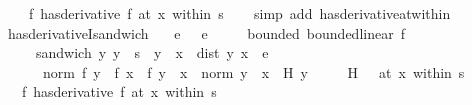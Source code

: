\begin{isabellebody}
\ \ \ \ {\isacharparenleft}{\kern0pt}f\ has{\isacharunderscore}{\kern0pt}derivative\ f{\isacharprime}{\kern0pt}{\isacharparenright}{\kern0pt}\ {\isacharparenleft}{\kern0pt}at\ x\ within\ s{\isacharparenright}{\kern0pt}{\isachardoublequoteclose}\isanewline
%
\isadelimproof
\ \ %
\endisadelimproof
%
\isatagproof
{}\isamarkupfalse%
\ {\isacharparenleft}{\kern0pt}simp\ add{\isacharcolon}{\kern0pt}\ has{\isacharunderscore}{\kern0pt}derivative{\isacharunderscore}{\kern0pt}at{\isacharunderscore}{\kern0pt}within{\isacharparenright}{\kern0pt}%
\endisatagproof
{\isafoldproof}%
%
\isadelimproof
\isanewline
%
\endisadelimproof
\isanewline
{}\isamarkupfalse%
\ has{\isacharunderscore}{\kern0pt}derivativeI{\isacharunderscore}{\kern0pt}sandwich{\isacharcolon}{\kern0pt}\isanewline
\ \ \ e{\isacharcolon}{\kern0pt}\ {\isachardoublequoteopen}{}\ {\isacharless}{\kern0pt}\ e{\isachardoublequoteclose}\isanewline
\ \ \ \ \ bounded{\isacharcolon}{\kern0pt}\ {\isachardoublequoteopen}bounded{\isacharunderscore}{\kern0pt}linear\ f{\isacharprime}{\kern0pt}{\isachardoublequoteclose}\isanewline
\ \ \ \ \ sandwich{\isacharcolon}{\kern0pt}\ {\isachardoublequoteopen}{\isacharparenleft}{\kern0pt}{\isasymAnd}y{\isachardot}{\kern0pt}\ y\ {\isasymin}\ s\ {\isasymLongrightarrow}\ y\ {\isasymnoteq}\ x\ {\isasymLongrightarrow}\ dist\ y\ x\ {\isacharless}{\kern0pt}\ e\ {\isasymLongrightarrow}\isanewline
\ \ \ \ \ \ norm\ {\isacharparenleft}{\kern0pt}{\isacharparenleft}{\kern0pt}f\ y\ {\isacharminus}{\kern0pt}\ f\ x{\isacharparenright}{\kern0pt}\ {\isacharminus}{\kern0pt}\ f{\isacharprime}{\kern0pt}\ {\isacharparenleft}{\kern0pt}y\ {\isacharminus}{\kern0pt}\ x{\isacharparenright}{\kern0pt}{\isacharparenright}{\kern0pt}\ {\isacharslash}{\kern0pt}\ norm\ {\isacharparenleft}{\kern0pt}y\ {\isacharminus}{\kern0pt}\ x{\isacharparenright}{\kern0pt}\ {\isasymle}\ H\ y{\isacharparenright}{\kern0pt}{\isachardoublequoteclose}\isanewline
\ \ \ \ \ {\isachardoublequoteopen}{\isacharparenleft}{\kern0pt}H\ {\isasymlonglongrightarrow}\ {}{\isacharparenright}{\kern0pt}\ {\isacharparenleft}{\kern0pt}at\ x\ within\ s{\isacharparenright}{\kern0pt}{\isachardoublequoteclose}\isanewline
\ \ \ {\isachardoublequoteopen}{\isacharparenleft}{\kern0pt}f\ has{\isacharunderscore}{\kern0pt}derivative\ f{\isacharprime}{\kern0pt}{\isacharparenright}{\kern0pt}\ {\isacharparenleft}{\kern0pt}at\ x\ within\ s{\isacharparenright}{\kern0pt}{\isachardoublequoteclose}\isanewline
%
\isadelimproof
\ \ %

\end{isabellebody}
